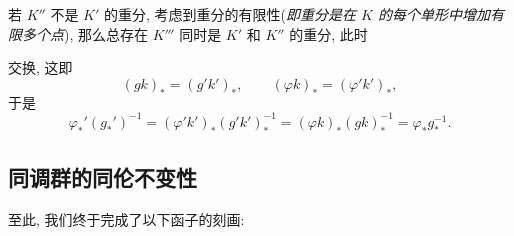 若 $ K'' $ 不是 $ K' $ 的重分, 考虑到重分的有限性(\textit{即重分是在 $ K $ 的每个单形中增加有限多个点}), 那么总存在 $ K''' $ 同时是 $ K' $ 和 $ K'' $ 的重分, 此时
\begin{center}
\end{center}
交换, 这即
\[
	(gk)_*=(g'k')_*,\qquad (\varphi k)_*=(\varphi'k')_*,
\]
于是
\[
	\varphi_*'(g_*')^{-1}=(\varphi'k')_*(g'k')_*^{-1}=(\varphi k)_*(gk)_*^{-1}=\varphi_*g_*^{-1}.
\]

\subsection{同调群的同伦不变性}

至此, 我们终于完成了以下函子的刻画:

